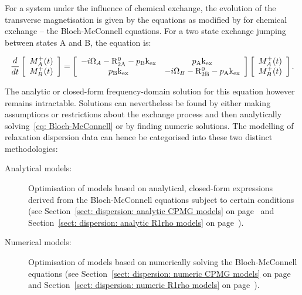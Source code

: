 For a system under the influence of chemical exchange, the evolution of the transverse magnetisation is given by the \citet{Bloch46} equations as modified by \citet{McConnell58} for chemical exchange -- the Bloch-McConnell equations.
For a two state exchange jumping between states A and B, the equation is:

\begin{equation} \label{eq: Bloch-McConnell}
    \frac{d}{dt} \left[ 
        \begin{array}{c}
            M_A^+(t) \\
            M_B^+(t)
        \end{array}
    \right] = \left[
        \begin{array}{cc}
            -i\Omega_A-\mathrm{R}_{\mathrm{2A}}^0-p_{\textrm{B}}\textrm{k}_{\textrm{ex}} & p_{\textrm{A}}\textrm{k}_{\textrm{ex}} \\
            p_{\textrm{B}}\textrm{k}_{\textrm{ex}} & -i\Omega_B-\mathrm{R}_{\mathrm{2B}}^0-p_{\textrm{A}}\textrm{k}_{\textrm{ex}} \\
        \end{array}
    \right] \left[
        \begin{array}{c}
            M_A^+(t) \\
            M_B^+(t)
        \end{array}
    \right] .
\end{equation}

The analytic or closed-form frequency-domain solution for this equation however remains intractable.
Solutions can nevertheless be found by either making assumptions or restrictions about the exchange process and then analytically solving~\ref{eq: Bloch-McConnell} or by finding numeric solutions.
The modelling of relaxation dispersion data can hence be categorised into these two distinct methodologies:
\begin{description}
  \item[Analytical models:]  Optimisation of models based on analytical, closed-form expressions derived from the Bloch-McConnell equations subject to certain conditions (see Section~\ref{sect: dispersion: analytic CPMG models} on page~\pageref{sect: dispersion: analytic CPMG models} and Section~\ref{sect: dispersion: analytic R1rho models} on page~\pageref{sect: dispersion: analytic R1rho models}).
  \item[Numerical models:]  Optimisation of models based on numerically solving the Bloch-McConnell equations (see Section~\ref{sect: dispersion: numeric CPMG models} on page~\pageref{sect: dispersion: numeric CPMG models} and Section~\ref{sect: dispersion: numeric R1rho models} on page~\pageref{sect: dispersion: numeric R1rho models}).
\end{description}



